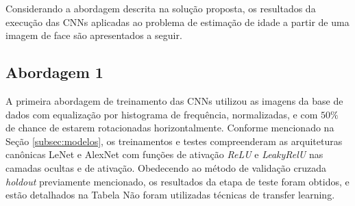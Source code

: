 
Considerando a abordagem descrita na solução proposta, os resultados da execução das CNNs aplicadas ao problema de estimação de idade a partir de uma imagem de face são apresentados a seguir.

%

\subsection{Abordagem 1}
A primeira abordagem de treinamento das CNNs utilizou as imagens da base de dados com equalização por histograma de frequência, normalizadas, e com $50\%$ de chance de estarem rotacionadas horizontalmente. Conforme mencionado na Seção \ref{subsec:modelos}, os treinamentos e testes compreenderam as arquiteturas canônicas LeNet e AlexNet com funções de ativação \emph{ReLU} e \emph{LeakyRelU} nas camadas ocultas e de ativação. Obedecendo ao método de validação cruzada \emph{holdout} previamente mencionado, os resultados da etapa de teste foram obtidos, e estão detalhados na Tabela
Não foram utilizadas técnicas de transfer learning.







